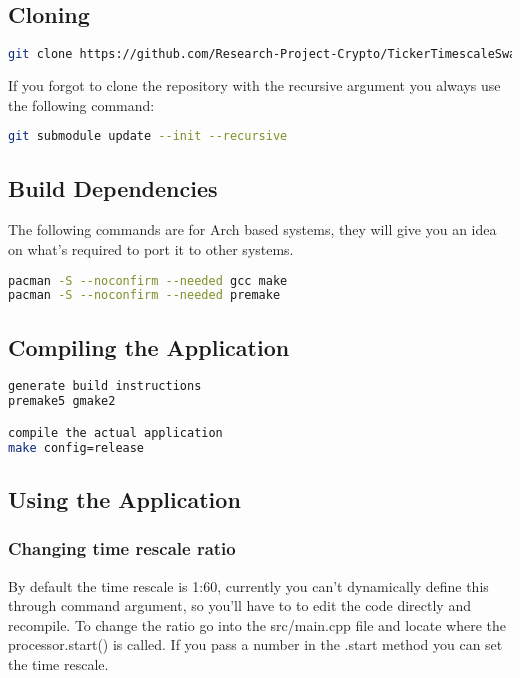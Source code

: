 \documentclass[12pt,a4paper]{article}
\begin{document}
\subsection{Cloning}

\begin{lstlisting}[language=bash]
git clone https://github.com/Research-Project-Crypto/TickerTimescaleSwap.git --recursive
\end{lstlisting}

If you forgot to clone the repository with the recursive argument you always use the following command:

\begin{lstlisting}[language=bash]
git submodule update --init --recursive
\end{lstlisting}

\subsection{Build Dependencies}

The following commands are for Arch based systems, they will give you an idea on what's required to port it to other systems.

\begin{lstlisting}[language=bash]
pacman -S --noconfirm --needed gcc make
pacman -S --noconfirm --needed premake
\end{lstlisting}

\subsection{Compiling the Application}

\begin{lstlisting}[language=bash]
generate build instructions
premake5 gmake2

compile the actual application
make config=release
\end{lstlisting}

\subsection{Using the Application}

\subsubsection{Changing time rescale ratio}

By default the time rescale is 1:60, currently you can't dynamically define this through command argument, so you'll have to to edit the code directly and recompile. To change the ratio go into the src/main.cpp file and locate where the processor.start() is called. If you pass a number in the .start method you can set the time rescale.
\end{document}
